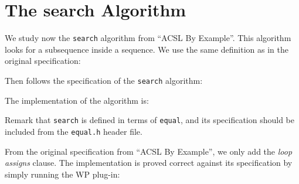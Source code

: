 \clearpage
\section{The \textsf{search} Algorithm}
\label{search}

We study now the \texttt{search} algorithm from ``ACSL By Example''.
This algorithm looks for a subsequence inside a sequence.
We use the same definition as in the original specification:


Then follows the specification of the \texttt{search} algorithm:


The implementation of the algorithm is:


Remark that \texttt{search} is defined in terms of \texttt{equal}, and
its specification should be included from the \texttt{equal.h} header
file.

\clearpage
From the original specification from ``ACSL By Example'', we only add
the \emph{loop assigns} clause.
The implementation is proved correct against its specification by
simply running the \textsf{WP} plug-in: 

